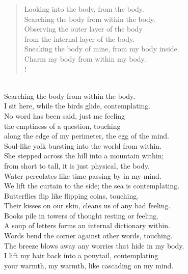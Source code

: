 
\bgroup\parindent 0pt\parskip 0pt

\prelude

\begin{verse}

Looking into the body, from the body.\\
Searching the body from within the body.\\
Observing the outer layer of the body \\
from the internal layer of the body.\\
Sneaking the body of mine, from my body inside.\\
Charm my body from within my body.\\!

\end{verse}

\fugue

\strut\\[10pt plus 2pt]

Searching the body from within the body.\\
I sit here, while the birds glide, contemplating.\\
No word has been said, just me feeling\\
the emptiness of a question, touching\\
along the edge of my perimeter, the egg of the mind.\\
Soul-like yolk bursting into the world from within.\\[10pt plus 2pt]

She stepped across the hill into a mountain within; \\
from short to tall, it is just physical, the body.\\
Water percolates like time passing by in my mind.\\
We lift the curtain to the side; the sea is contemplating. \\
Butterflies flip like flipping coins, touching.\\
Their kisses on our skin, cleans us of any bad feeling.\\[10pt plus 2pt]

Books pile in towers of thought resting or feeling.\\
A soup of letters forms an internal dictionary within.\\
Words bend the corner against other words, touching. \\
The breeze blows away any worries that hide in my body.\\
I lift my hair back into a ponytail, contemplating\\
your warmth, my warmth, like cascading on my mind. \\[10pt plus 2pt]

